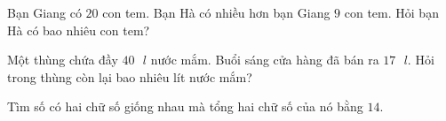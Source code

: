 \begin{bt}[1,5 điểm]
Bạn Giang có $20$ con tem. Bạn Hà có nhiều hơn bạn Giang $9$ con tem. Hỏi bạn Hà có bao nhiêu con tem?
\end{bt}

\begin{bt}[1,0 điểm]
Một thùng chứa đầy $40\text{ }l$ nước mắm. Buổi sáng cửa hàng đã bán ra $17\text{ }l$. Hỏi trong thùng còn lại bao nhiêu lít nước mắm?
\end{bt}

\begin{bt}[1,0 điểm]
Tìm số có hai chữ số giống nhau mà tổng hai chữ số của nó bằng $14$.
\end{bt}

